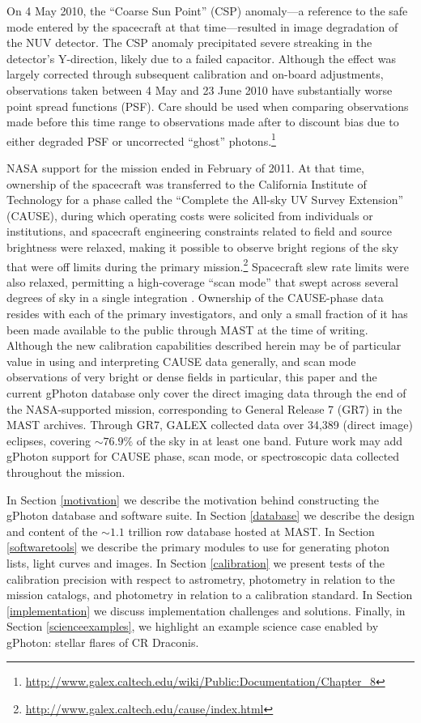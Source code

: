 \documentclass[iop]{emulateapj}
\begin{document}
On 4 May 2010, the ``Coarse Sun Point'' (CSP) anomaly---a reference to the safe mode entered by the spacecraft at that time---resulted in image degradation of the NUV detector. The CSP anomaly precipitated severe streaking in the detector's Y-direction, likely due to a failed capacitor. Although the effect was largely corrected through subsequent calibration and on-board adjustments, observations taken between 4 May and 23 June 2010 have substantially worse point spread functions (PSF). Care should be used when comparing observations made before this time range to observations made after to discount bias due to either degraded PSF or uncorrected ``ghost'' photons.\footnote{\url{http://www.galex.caltech.edu/wiki/Public:Documentation/Chapter_8}}

NASA support for the mission ended in February of 2011. At that time, ownership of the spacecraft was transferred to the California Institute of Technology for a phase called the ``Complete the All-sky UV Survey Extension'' (CAUSE), during which operating costs were solicited from individuals or institutions, and spacecraft engineering constraints related to field and source brightness were relaxed, making it possible to observe bright regions of the sky that were off limits during the primary mission.\footnote{\url{http://www.galex.caltech.edu/cause/index.html}} Spacecraft slew rate limits were also relaxed, permitting a high-coverage ``scan mode'' that swept across several degrees of sky in a single integration \citep{olmedo2015deep}. Ownership of the CAUSE-phase data resides with each of the primary investigators, and only a small fraction of it has been made available to the public through MAST at the time of writing.  Although the new calibration capabilities described herein may be of particular value in using and interpreting CAUSE data generally, and scan mode observations of very bright or dense fields in particular, this paper and the current gPhoton database only cover the direct imaging data through the end of the NASA-supported mission, corresponding to General Release 7 (GR7) in the MAST archives. Through GR7, GALEX collected data over 34,389 (direct image) eclipses, covering $\sim76.9\%$ of the sky in at least one band. Future work may add gPhoton support for CAUSE phase, scan mode, or spectroscopic data collected throughout the mission.

In Section \ref{motivation} we describe the motivation behind constructing the gPhoton database and software suite. In Section \ref{database} we describe the design and content of the $\sim 1.1$ trillion row database hosted at MAST. In Section \ref{softwaretools} we describe the primary modules to use for generating photon lists, light curves and images. In Section \ref{calibration} we present tests of the calibration precision with respect to astrometry, photometry in relation to the mission catalogs, and photometry in relation to a calibration standard. In Section \ref{implementation} we discuss implementation challenges and solutions. Finally, in Section \ref{scienceexamples}, we highlight an example science case enabled by gPhoton: stellar flares of CR Draconis.
\end{document}
